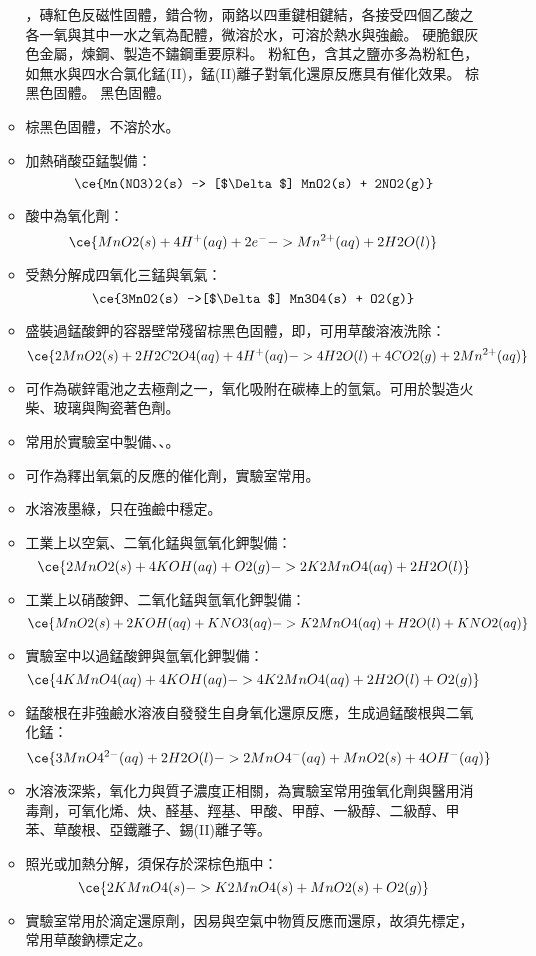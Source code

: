\documentclass[a4paper,12pt]{report}
\begin{document}
\begin{itemize}
\begin{itemize}
\ce{[Cr2(CH3COO)4(H2O)2]}，磚紅色反磁性固體，錯合物，兩鉻以四重鍵相鍵結，各接受四個乙酸之各一氧與其中一水之氧為配體，微溶於水，可溶於熱水與強鹼。
硬脆銀灰色金屬，煉鋼、製造不鏽鋼重要原料。
粉紅色，含其之鹽亦多為粉紅色，如無水與四水合氯化錳(II)，錳(II)離子對氧化還原反應具有催化效果。
棕黑色固體。
黑色固體。
\bit
\item 棕黑色固體，不溶於水。
\item 加熱硝酸亞錳製備：
\[\ce{Mn(NO3)2(s) -> [$\Delta$] MnO2(s) + 2NO2(g)}\]
\item 酸中為氧化劑：
\[\ce{MnO2(s) + 4H^+(aq) + 2e^- -> Mn^{2+}(aq) + 2H2O(l)}\]
\item 受熱分解成四氧化三錳與氧氣：
\[\ce{3MnO2(s) ->[$\Delta$] Mn3O4(s) + O2(g)}\]
\item 盛裝過錳酸鉀的容器壁常殘留棕黑色固體，即，可用草酸溶液洗除：
\[\ce{2MnO2(s) + 2H2C2O4(aq) + 4H^+(aq) -> 4H2O(l) + 4CO2(g) + 2Mn^{2+}(aq)}\]
\item 可作為碳鋅電池之去極劑之一，氧化吸附在碳棒上的氫氣。可用於製造火柴、玻璃與陶瓷著色劑。
\item 常用於實驗室中製備、、。
\item 可作為釋出氧氣的反應的催化劑，實驗室常用。
\eit
{}
\bit
\item 水溶液墨綠，只在強鹼中穩定。
\item 工業上以空氣、二氧化錳與氫氧化鉀製備：
\[\ce{2MnO2(s) + 4KOH(aq) + O2(g) -> 2K2MnO4(aq) + 2H2O(l)}\]
\item 工業上以硝酸鉀、二氧化錳與氫氧化鉀製備：
\[\ce{MnO2(s) + 2KOH(aq) + KNO3(aq) -> K2MnO4(aq) + H2O(l) + KNO2(aq)}\]
\item 實驗室中以過錳酸鉀與氫氧化鉀製備：
\[\ce{4KMnO4(aq) + 4KOH(aq) -> 4K2MnO4(aq) + 2H2O(l) + O2(g)}\]
\item 錳酸根在非強鹼水溶液自發發生自身氧化還原反應，生成過錳酸根與二氧化錳：
\[\ce{3MnO4^{2-}(aq) + 2H2O(l) -> 2MnO4^-(aq) + MnO2(s) + 4OH^-(aq)}\]
\eit
{}
\bit
\item 水溶液深紫，氧化力與質子濃度正相關，為實驗室常用強氧化劑與醫用消毒劑，可氧化烯、炔、醛基、羥基、甲酸、甲醇、一級醇、二級醇、甲苯、草酸根、亞鐵離子、錫(II)離子等。
\item 照光或加熱分解，須保存於深棕色瓶中：
\[\ce{2KMnO4(s) -> K2MnO4(s) + MnO2(s) + O2(g)}\]
\item 實驗室常用於滴定還原劑，因易與空氣中物質反應而還原，故須先標定，常用草酸鈉標定之。

\end{itemize}
\end{itemize}
\end{document}
